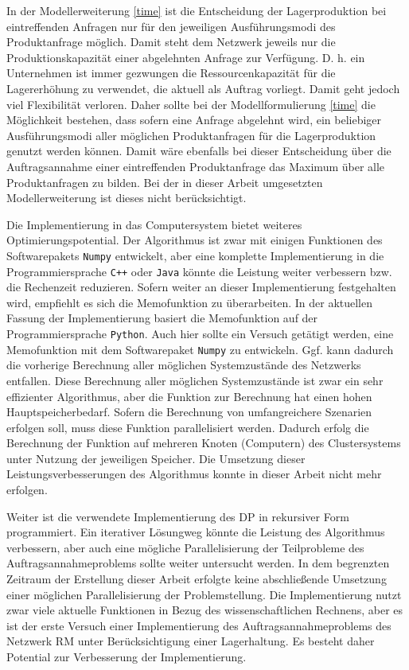 In der Modellerweiterung \eqref{time} ist die Entscheidung der Lagerproduktion bei eintreffenden Anfragen nur für den jeweiligen Ausführungsmodi des Produktanfrage möglich. Damit steht dem Netzwerk jeweils nur die Produktionskapazität einer abgelehnten Anfrage zur Verfügung. D. h. ein Unternehmen ist immer gezwungen die Ressourcenkapazität für die Lagererhöhung zu verwendet, die aktuell als Auftrag vorliegt. Damit geht jedoch viel Flexibilität verloren. Daher sollte bei der Modellformulierung \eqref{time} die Möglichkeit bestehen, dass sofern eine Anfrage abgelehnt wird, ein beliebiger Ausführungsmodi aller möglichen Produktanfragen für die Lagerproduktion genutzt werden können. Damit wäre ebenfalls bei dieser Entscheidung über die Auftragsannahme einer eintreffenden Produktanfrage das Maximum über alle Produktanfragen zu bilden. Bei der in dieser Arbeit umgesetzten Modellerweiterung ist dieses nicht berücksichtigt.

Die Implementierung in das Computersystem bietet weiteres Optimierungspotential. Der Algorithmus ist zwar mit einigen Funktionen des Softwarepakets \texttt{Numpy} entwickelt, aber eine komplette Implementierung in die Programmiersprache \texttt{C++} oder \texttt{Java} könnte die Leistung weiter verbessern bzw. die Rechenzeit reduzieren. Sofern weiter an dieser Implementierung festgehalten wird, empfiehlt es sich die Memofunktion zu überarbeiten. In der aktuellen Fassung der Implementierung basiert die Memofunktion auf der Programmiersprache \texttt{Python}. Auch hier sollte ein Versuch getätigt werden, eine Memofunktion mit dem Softwarepaket \texttt{Numpy} zu entwickeln. Ggf. kann dadurch die vorherige Berechnung aller möglichen Systemzustände des Netzwerks entfallen. Diese Berechnung aller möglichen Systemzustände ist zwar ein sehr effizienter Algorithmus, aber die Funktion zur Berechnung hat einen hohen Hauptspeicherbedarf. Sofern die Berechnung von umfangreichere Szenarien erfolgen soll, muss diese Funktion parallelisiert werden. Dadurch erfolg die Berechnung der Funktion auf mehreren Knoten (Computern) des Clustersystems unter Nutzung der jeweiligen Speicher. Die Umsetzung dieser Leistungsverbesserungen des Algorithmus konnte in dieser Arbeit nicht mehr erfolgen.

Weiter ist die verwendete Implementierung des DP in rekursiver Form programmiert. Ein iterativer Lösungweg könnte die Leistung des Algorithmus verbessern, aber auch eine mögliche Parallelisierung der Teilprobleme des Auftragsannahmeproblems sollte weiter untersucht werden. In dem begrenzten Zeitraum der Erstellung dieser Arbeit erfolgte keine abschließende Umsetzung einer möglichen Parallelisierung der Problemstellung. Die Implementierung nutzt zwar viele aktuelle Funktionen in Bezug des wissenschaftlichen Rechnens, aber es ist der erste Versuch einer Implementierung des Auftragsannahmeproblems des Netzwerk RM unter Berücksichtigung einer Lagerhaltung. Es besteht daher Potential zur Verbesserung der Implementierung.

